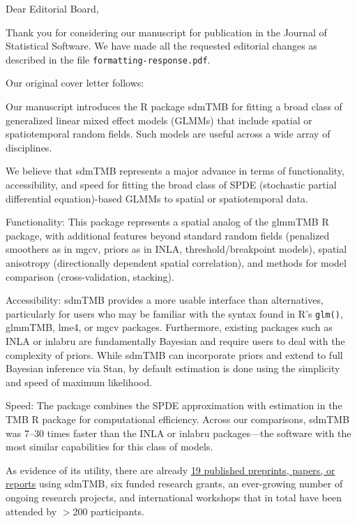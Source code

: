 \documentclass[letterpaper]{letter}
\providecommand{\pkg}[1]{{\normalfont\fontseries{b}\selectfont #1}}
\let\proglang=\textsf
\begin{document}
\begin{letter}{}
\pagestyle{empty}

\opening{Dear Editorial Board,}

Thank you for considering our manuscript for publication in the Journal of Statistical Software. We have made all the requested editorial changes as described in the file \texttt{formatting-response.pdf}.

Our original cover letter follows:

Our manuscript introduces the \proglang{R} package \pkg{sdmTMB} for fitting a broad class of generalized linear mixed effect models (GLMMs) that include spatial or spatiotemporal random fields. Such models are useful across a wide array of disciplines.

We believe that \pkg{sdmTMB} represents a major advance in terms of functionality, accessibility, and speed for fitting the broad class of SPDE (stochastic partial differential equation)-based GLMMs to spatial or spatiotemporal data.

Functionality: This package represents a spatial analog of the \pkg{glmmTMB} \proglang{R} package, with additional features beyond standard random fields (penalized smoothers as in \pkg{mgcv}, priors as in \pkg{INLA}, threshold/breakpoint models), spatial anisotropy (directionally dependent spatial correlation), and methods for model comparison (cross-validation, stacking).

Accessibility: \pkg{sdmTMB} provides a more usable interface than alternatives, particularly for users who may be familiar with the syntax found in \proglang{R}'s \texttt{glm()}, \pkg{glmmTMB}, \pkg{lme4}, or \pkg{mgcv} packages. Furthermore, existing packages such as \pkg{INLA} or \pkg{inlabru} are fundamentally Bayesian and require users to deal with the complexity of priors. While \pkg{sdmTMB} can incorporate priors and extend to full Bayesian inference via \pkg{Stan}, by default estimation is done using the simplicity and speed of maximum likelihood.

Speed: The package combines the SPDE approximation with estimation in the \pkg{TMB} \proglang{R} package for computational efficiency. Across our comparisons, \pkg{sdmTMB} was 7--30 times faster than the \pkg{INLA} or \pkg{inlabru} packages---the software with the most similar capabilities for this class of models.

As evidence of its utility, there are already \href{https://github.com/pbs-assess/sdmTMB/wiki/Publications-using-sdmTMB}{19 published preprints, papers, or reports} using \pkg{sdmTMB}, six funded research grants, an ever-growing number of ongoing research projects, and international workshops that in total have been attended by $>$200 participants.


\end{letter}
\end{document}
